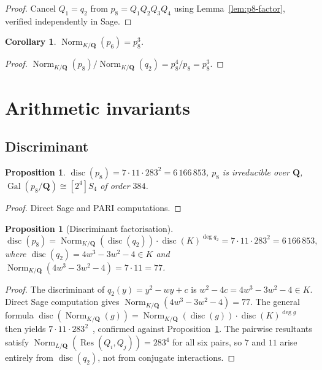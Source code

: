 \documentclass[12pt]{amsart}
\newtheorem{proposition}[theorem]{Proposition}
\newtheorem{corollary}[theorem]{Corollary}
\theoremstyle{definition}
\newcommand{\QQ}{\mathbf{Q}}
\DeclareMathOperator{\Norm}{Norm}
\DeclareMathOperator{\Gal}{Gal}
\DeclareMathOperator{\disc}{disc}
\begin{document}
\begin{proof}
Cancel $Q_1 = q_2$ from $p_8 = Q_1 Q_2 Q_3 Q_4$ using
Lemma~\ref{lem:p8-factor}, verified independently in Sage.
\end{proof}

\begin{corollary}\label{cor:norm-sextic}
$\Norm_{K/\QQ}(p_6) = p_8^3$.
\end{corollary}

\begin{proof}
$\Norm_{K/\QQ}(p_8)/\Norm_{K/\QQ}(q_2) = p_8^4/p_8 = p_8^3$.
\end{proof}

\section{Arithmetic invariants}

\subsection{Discriminant}

\begin{proposition}\label{prop:disc-galois}
$\disc(p_8) = 7 \cdot 11 \cdot 283^2 = 6\,166\,853$,
$p_8$ is irreducible over $\QQ$,
$\Gal(p_8/\QQ) \cong [2^4]S_4$ of order $384$.
\end{proposition}

\begin{proof}
Direct Sage and PARI computations.
\end{proof}

\begin{proposition}[Discriminant factorisation]\label{prop:disc-factorisation}
\[
  \disc(p_8)
  = \Norm_{K/\QQ}(\disc(q_2)) \cdot \disc(K)^{\deg q_2}
  = 7 \cdot 11 \cdot 283^2 = 6\,166\,853,
\]
where $\disc(q_2) = 4w^3 - 3w^2 - 4 \in K$ and
$\Norm_{K/\QQ}(4w^3 - 3w^2 - 4) = 7 \cdot 11 = 77$.
\end{proposition}

\begin{proof}
The discriminant of $q_2(y) = y^2 - wy + c$ is $w^2 - 4c =
4w^3 - 3w^2 - 4 \in K$.
Direct Sage computation gives $\Norm_{K/\QQ}(4w^3-3w^2-4) = 77$.
The general formula
$\disc(\Norm_{K/\QQ}(g)) = \Norm_{K/\QQ}(\disc(g)) \cdot \disc(K)^{\deg g}$
then yields $7 \cdot 11 \cdot 283^2$~\cite{Neu90}, confirmed against
Proposition~\ref{prop:disc-galois}.
The pairwise resultants satisfy
$\Norm_{L/\QQ}(\operatorname{Res}(Q_i, Q_j)) = 283^4$ for all six pairs,
so $7$ and $11$ arise entirely from $\disc(q_2)$, not from
conjugate interactions.
\end{proof}
\end{document}
